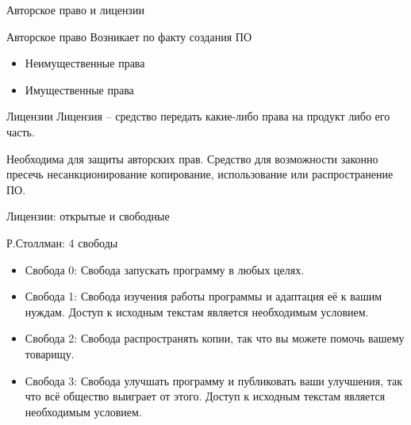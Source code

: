 \begin{frame}{Авторское право и лицензии}

	\begin{block}{Авторское право}
		 Возникает по факту создания ПО 

		\begin{itemize}
			\item Неимущественные права
			\item Имущественные права
		\end{itemize}
	\end{block}

	\pause

    \begin{block}{Лицензии}
		Лицензия -- средство передать какие-либо права на продукт либо его часть.

		Необходима для защиты авторских прав. 
		Средство для возможности законно пресечь несанкционирование копирование,  использование или распространение ПО. 
	\end{block}
\end{frame}


\begin{frame}{Лицензии: открытые и свободные}
	\begin{block}{Р.Столлман: 4 свободы}
		\begin{itemize}
			\item Свобода 0: Свобода запускать программу в любых целях.
			\item Свобода 1: Свобода изучения работы программы и адаптация её к вашим нуждам. 
				Доступ к исходным текстам является необходимым условием.
			\item Свобода 2: Свобода распространять копии,  так что вы можете помочь вашему товарищу.
			\item Свобода 3: Свобода улучшать программу и публиковать ваши улучшения,
				так что всё общество выиграет от этого.
				Доступ к исходным текстам является необходимым условием.
		\end{itemize}
	\end{block}
\end{frame}


